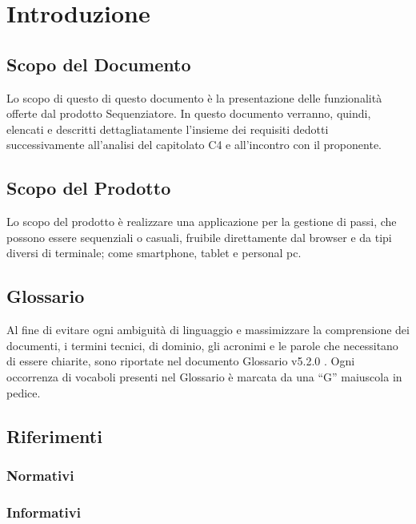 \section{Introduzione}
\subsection{Scopo del Documento}
Lo scopo di questo di questo documento è la presentazione delle funzionalità offerte dal prodotto Sequenziatore. In questo documento verranno, quindi, elencati e descritti dettagliatamente l'insieme dei requisiti dedotti successivamente all'analisi del capitolato C4 e all'incontro con il proponente.
\subsection{Scopo del Prodotto}
Lo scopo del prodotto è realizzare una applicazione per la gestione di passi, che possono essere sequenziali o casuali, fruibile direttamente dal browser e da tipi diversi di terminale; come smartphone, tablet e personal pc.
\subsection{Glossario}
Al fine di evitare ogni ambiguità di linguaggio e massimizzare la comprensione dei
documenti, i termini tecnici, di dominio, gli acronimi e le parole che necessitano di
essere chiarite, sono riportate nel documento Glossario v5.2.0 .
Ogni occorrenza di vocaboli presenti nel Glossario è marcata da una “G” maiuscola in
pedice.
\subsection{Riferimenti}
\subsubsection{Normativi}
\subsubsection{Informativi}